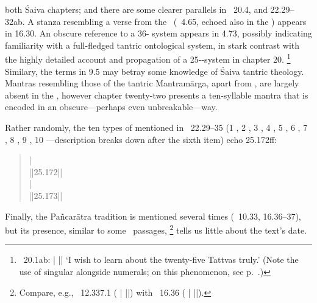 both Śaiva chapters; and there are some clearer parallels in \VSS\ 20.4, and 22.29--32ab.
A stanza resembling a verse from the \NisvMukha\ (\NISVMUKHA\ 4.65, echoed also in the ) appears in 16.30.
An obscure reference to a 36- system appears in 4.73, possibly indicating familiarity with a full-fledged tantric ontological system, in stark contrast with the highly detailed account and propagation of a 25--system in chapter 20.%
			\footnote{\VSS\ 20.1ab: 
			 |
			 ||
        `I wish to learn about the twenty-five 
        Tattvas truly.' (Note the use of singular alongside numerals; on this phenomenon, see
        p.~\pageref{singularwithnumerals}.) }
Similary, the terms  in 9.5 may betray some knowledge of Śaiva tantric theology. Mantras resembling those of the tantric Mantra\-mārga, apart from , are largely absent in the \VSS, however
chapter twenty-two presents a ten-syllable mantra that is encoded in an obscure---perhaps even unbreakable---way.

Rather randomly, the ten types of  mentioned in \VSS\ 22.29--35
(1 , 2 , 3 , 4 , 5 ,
6 , 7 , 8 , 9 , 10 ---description
 breaks down after the sixth item) echo  25.172ff:

\begin{quote}
 |\\
 ||25.172||\\
 |\\
 ||25.173||\\
\end{quote}



\noindent
Finally, the Pañcarātra tradition is mentioned several times (\VSS\ 10.33,
 16.36--37), but its presence, similar to some \MBH\ passages,%
			\footnote{Compare, e.g., \MBH\ 12.337.1
			( |
		     ||) with
		    \VSS\ 16.36 
		    ( |
			 ||).} 
tells us little about the text's date.						

